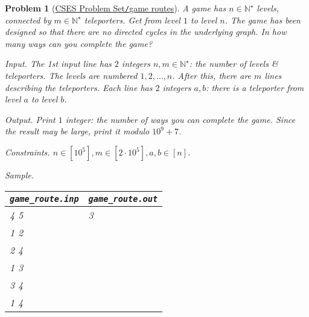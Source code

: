 \documentclass{article}
\newtheorem{problem}{Problem}
\begin{document}
\begin{problem}[\href{https://cses.fi/problemset/task/1681}{CSES Problem Set{\tt/}game routes}]
    A game has $n\in\mathbb{N}^\star$ levels, connected by $m\in\mathbb{N}^\star$ teleporters. Get from level $1$ to level $n$. The game has been designed so that there are no directed cycles in the underlying graph. In how many ways can you complete the game?
    \item {\sf Input.} The 1st input line has $2$ integers $n,m\in\mathbb{N}^\star$: the number of levels \& teleporters. The levels are numbered $1,2,\ldots,n$. After this, there are $m$ lines describing the teleporters. Each line has $2$ integers $a,b$: there is a teleporter from level $a$ to level $b$.
    \item {\sf Output.} Print $1$ integer: the number of ways you can complete the game. Since the result may be large, print it modulo $10^9 + 7$.
    \item {\sf Constraints.} $n\in[10^5],m\in[2\cdot10^5],a,b\in[n]$.
    \item {\sf Sample.}
    \begin{table}[H]
        \centering
        \begin{tabular}{|l|l|}
            \hline
            \verb|game_route.inp| & \verb|game_route.out| \\
            \hline
            4 5 & 3 \\
            1 2 & \\
            2 4 & \\
            1 3 & \\
            3 4 & \\
            1 4 & \\
            \hline
        \end{tabular}
    \end{table}
\end{problem}
\end{document}
